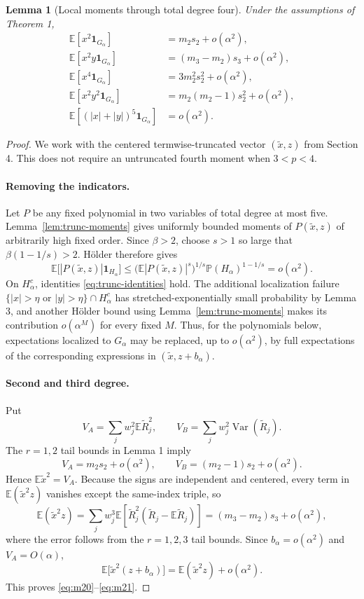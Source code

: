 \documentclass[11pt,a4paper]{article}
\newtheorem{lemma}{Lemma}
\newcommand{\E}{\mathbb E}
\newcommand{\Var}{\operatorname{Var}}
\newcommand{\Prob}{\mathbb P}
\begin{document}
\begin{lemma}[Local moments through total degree four]
Under the assumptions of Theorem 1,
\begin{align}
\E[x^2\mathbf 1_{G_\alpha}]&=m_2s_2+o(\alpha^2),\label{eq:m20}\\
\E[x^2y\mathbf 1_{G_\alpha}]&=(m_3-m_2)s_3+o(\alpha^2),\label{eq:m21}\\
\E[x^4\mathbf 1_{G_\alpha}]&=3m_2^2s_2^2+o(\alpha^2),\label{eq:m40}\\
\E[x^2y^2\mathbf 1_{G_\alpha}]&=m_2(m_2-1)s_2^2+o(\alpha^2),\label{eq:m22}\\
\E[(|x|+|y|)^5\mathbf 1_{G_\alpha}]&=o(\alpha^2).\label{eq:m5}
\end{align}
\end{lemma}

\begin{proof}
We work with the centered termwise-truncated vector $(\widetilde x,z)$ from
Section 4.  This does not require an untruncated fourth moment when $3<p<4$.

\paragraph{Removing the indicators.}
Let $P$ be any fixed polynomial in two variables of total degree at most five.  Lemma~\ref{lem:trunc-moments} gives uniformly bounded moments of $P(\widetilde x,z)$ of arbitrarily high fixed order.  Since $\beta>2$, choose $s>1$ so large that $\beta(1-1/s)>2$.  H\"older therefore gives
\[
\E\bigl[|P(\widetilde x,z)|\mathbf 1_{H_\alpha}\bigr]
\le
\bigl(\E|P(\widetilde x,z)|^s\bigr)^{1/s}
\Prob(H_\alpha)^{1-1/s}
=o(\alpha^2).
\]
On $H_\alpha^c$, identities \eqref{eq:trunc-identities} hold.  The additional localization failure
$\{|x|>\eta\text{ or }|y|>\eta\}\cap H_\alpha^c$ has stretched-exponentially small probability by Lemma 3, and another H\"older bound using Lemma~\ref{lem:trunc-moments} makes its contribution $o(\alpha^M)$ for every fixed $M$.  Thus, for the polynomials below, expectations localized to $G_\alpha$ may be replaced, up to $o(\alpha^2)$, by full expectations of the corresponding expressions in $(\widetilde x,z+b_\alpha)$.

\paragraph{Second and third degree.}
Put
\[
V_A=\sum_jw_j^2\E\widetilde R_j^2,
\qquad
V_B=\sum_jw_j^2\Var(\widetilde R_j).
\]
The $r=1,2$ tail bounds in Lemma 1 imply
\begin{equation}\label{eq:VA-VB}
V_A=m_2s_2+o(\alpha^2),
\qquad
V_B=(m_2-1)s_2+o(\alpha^2).
\end{equation}
Hence $\E\widetilde x^2=V_A$.  Because the signs are independent and centered, every term in $\E(\widetilde x^2z)$ vanishes except the same-index triple, so
\[
\E(\widetilde x^2z)
=\sum_jw_j^3
\E\!\left[\widetilde R_j^2(\widetilde R_j-\E\widetilde R_j)\right]
=(m_3-m_2)s_3+o(\alpha^2),
\]
where the error follows from the $r=1,2,3$ tail bounds.  Since $b_\alpha=o(\alpha^2)$ and $V_A=O(\alpha)$,
\[
\E\bigl[\widetilde x^2(z+b_\alpha)\bigr]
=\E(\widetilde x^2z)+o(\alpha^2).
\]
This proves \eqref{eq:m20}--\eqref{eq:m21}.


\end{proof}
\end{document}
